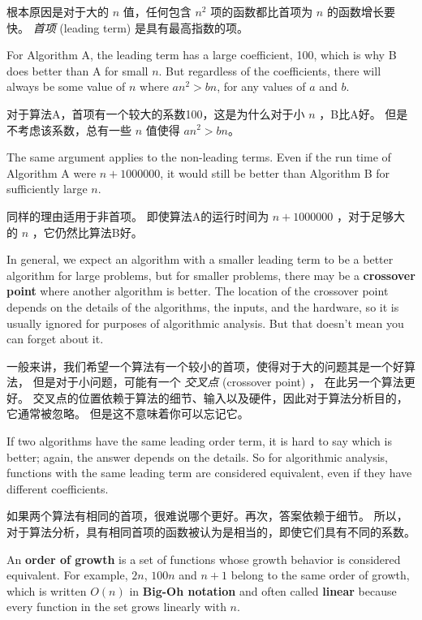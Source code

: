 根本原因是对于大的 $n$ 值，任何包含 $n^2$ 项的函数都比首项为 $n$ 的函数增长要快。
{\em 首项} (leading term) 是具有最高指数的项。
  

For Algorithm A, the leading term has a large coefficient, 100, which
is why B does better than A for small $n$.  But regardless of the
coefficients, there will always be some value of $n$ where
$a n^2 > b n$, for any values of $a$ and $b$.

对于算法A，首项有一个较大的系数100，这是为什么对于小 $n$ ，B比A好。
但是不考虑该系数，总有一些 $n$ 值使得 $a n^2 > b n$。

The same argument applies to the non-leading terms.  Even if the run
time of Algorithm A were $n+1000000$, it would still be better than
Algorithm B for sufficiently large $n$.

同样的理由适用于非首项。
即使算法A的运行时间为 $n+1000000$ ，对于足够大的 $n$ ，它仍然比算法B好。

In general, we expect an algorithm with a smaller leading term to be a
better algorithm for large problems, but for smaller problems, there
may be a {\bf crossover point} where another algorithm is better.  The
location of the crossover point depends on the details of the
algorithms, the inputs, and the hardware, so it is usually ignored for
purposes of algorithmic analysis.  But that doesn't mean you can forget
about it.

一般来讲，我们希望一个算法有一个较小的首项，使得对于大的问题其是一个好算法，
但是对于小问题，可能有一个 {\em 交叉点} (crossover point) ， 在此另一个算法更好。
交叉点的位置依赖于算法的细节、输入以及硬件，因此对于算法分析目的，它通常被忽略。
但是这不意味着你可以忘记它。

If two algorithms have the same leading order term, it is hard to say
which is better; again, the answer depends on the details.  So for
algorithmic analysis, functions with the same leading term
are considered equivalent, even if they have different coefficients.

如果两个算法有相同的首项，很难说哪个更好。再次，答案依赖于细节。
所以，对于算法分析，具有相同首项的函数被认为是相当的，即使它们具有不同的系数。

An {\bf order of growth} is a set of functions whose growth
behavior is considered equivalent.  For example, $2n$, $100n$ and $n+1$
belong to the same order of growth, which is written $O(n)$ in
{\bf Big-Oh notation} and often called {\bf linear} because every function
in the set grows linearly with $n$.

